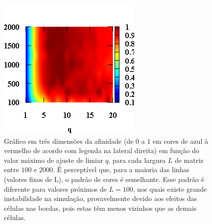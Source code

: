\documentclass[11pt,a4paper,twocolumn,final]{article}
\begin{document}
\begin{figure}
    \centering
    \includegraphics[width=.9\linewidth]{afinidadesHeatmap.png}
    \caption{Gráfico em três dimensões da afinidade (de $0$ a $1$ em cores de azul à vermelho de acordo com legenda na lateral direita) em função do valor máximo de ajuste de limiar $q$, para cada largura $L$ de matriz entre $100$ e $2000$. É perceptível que, para a maioria das linhas (valores fixos de L), o padrão de cores é semelhante. Esse padrão é diferente para valores próximos de $L=100$, nos quais existe grande instabilidade na simulação, provavelmente devido aos efeitos das células nas bordas, pois estas têm menos vizinhos que as demais células.}
    \label{fig:afinidadesHeatmap}
\end{figure}
\end{document}
